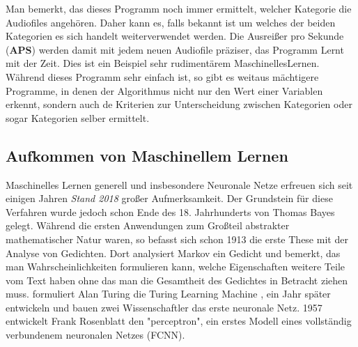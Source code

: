 \documentclass{thesisclass}
\begin{document}
Man bemerkt, das dieses Programm noch immer ermittelt, welcher Kategorie die Audiofiles angehören. Daher kann es, falls bekannt ist um welches der beiden Kategorien es sich handelt weiterverwendet werden. Die Ausreißer pro Sekunde (\textbf{APS}) werden damit mit jedem neuen Audiofile präziser, das Programm Lernt mit der Zeit. Dies ist ein Beispiel sehr rudimentärem \gls{MaschinellesLernen}.\newline
Während dieses Programm sehr einfach ist, so gibt es weitaus mächtigere Programme, in denen der Algorithmus nicht nur den Wert einer Variablen erkennt, sondern auch de Kriterien zur Unterscheidung zwischen Kategorien oder sogar Kategorien selber ermittelt.

\subsection{Aufkommen von Maschinellem Lernen}
Maschinelles Lernen generell und insbesondere Neuronale Netze erfreuen sich seit einigen Jahren \textit{Stand 2018} großer Aufmerksamkeit. Der Grundstein für diese Verfahren wurde jedoch schon Ende des 18. Jahrhunderts von Thomas Bayes gelegt\cite{bayes1763essay}. \newline
Während die ersten Anwendungen zum Großteil abstrakter mathematischer Natur waren\cite{legendre1805nouvelles}, so befasst sich schon 1913 die erste These mit der Analyse von Gedichten\cite{markov2006example}. Dort analysiert Markov ein Gedicht und bemerkt, das man Wahrscheinlichkeiten formulieren kann, welche Eigenschaften weitere Teile vom Text haben ohne das man die Gesamtheit des Gedichtes in Betracht ziehen muss.  formuliert Alan Turing die Turing Learning Machine \cite{machinery1950computing}, ein Jahr später entwickeln und bauen zwei Wissenschaftler das erste neuronale Netz\cite{snarc}. 1957 entwickelt Frank Rosenblatt den "perceptron"\cite{rosenblatt1958perceptron}, ein erstes Modell eines vollständig verbundenem neuronalen Netzes (\gls{FCNN}).
\end{document}
